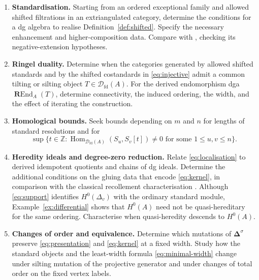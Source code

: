 \documentclass[11pt,a4paper]{article}
\newcommand{\D}{\mathcal D}
\newcommand{\ZZ}{\mathbb{Z}}
\newcommand{\RR}{\mathbf{R}}
\newcommand{\std}{\Delta}
\DeclareMathOperator{\fd}{fd}
\DeclareMathOperator{\Hom}{Hom}
\DeclareMathOperator{\REnd}{\RR End}
\theoremstyle{plain}
\theoremstyle{definition}
\numberwithin{equation}{section}
\begin{document}
\begin{enumerate}[label=\textbf{P\arabic*.}]
\item \textbf{Standardisation.}
Starting from an ordered exceptional family and allowed shifted
filtrations in an extriangulated category, determine the conditions
for a dg algebra to realise Definition~\ref{def:shifted}.
Specify the necessary enhancement and higher-composition data.
Compare with \cite{AT24}, checking its negative-extension hypotheses.

\item \textbf{Ringel duality.}
Determine when the categories generated by allowed shifted standards
and by the shifted costandards in \eqref{eq:injective} admit a common
tilting or silting object $T\in\D_{\fd}(A)$.
For the derived endomorphism dga $\REnd_A(T)$, determine connectivity,
the induced ordering, the width, and the effect of iterating the
construction.

\item \textbf{Homological bounds.}
Seek bounds depending on $m$ and $n$ for lengths of standard
resolutions and for
\[
 \sup\{t\in\ZZ:\Hom_{\D_{\fd}(A)}(S_u,S_v[t])\neq0
                \text{ for some }1\leq u,v\leq n\}.
\]

\item \textbf{Heredity ideals and degree-zero reduction.}
Relate \eqref{eq:localisation} to derived idempotent quotients and
chains of dg ideals. Determine the additional conditions on the
gluing data that encode \eqref{eq:kernel}, in comparison with the
classical recollement characterisation \cite{Kra17}.
Although \eqref{eq:support} identifies $H^0(\std_v)$ with the
ordinary standard module, Example~\ref{ex:differential} shows that
$H^0(A)$ need not be quasi-hereditary for the same ordering.
Characterise when quasi-heredity descends to $H^0(A)$.

\item \textbf{Changes of order and equivalence.}
Determine which mutations of $\boldsymbol\std^\sigma$ preserve
\eqref{eq:presentation} and \eqref{eq:kernel} at a fixed width.
Study how the standard objects and the least-width formula
\eqref{eq:minimal-width} change under silting mutation of the
projective generator and under changes of total order on the fixed
vertex labels.
\end{enumerate}
\end{document}
